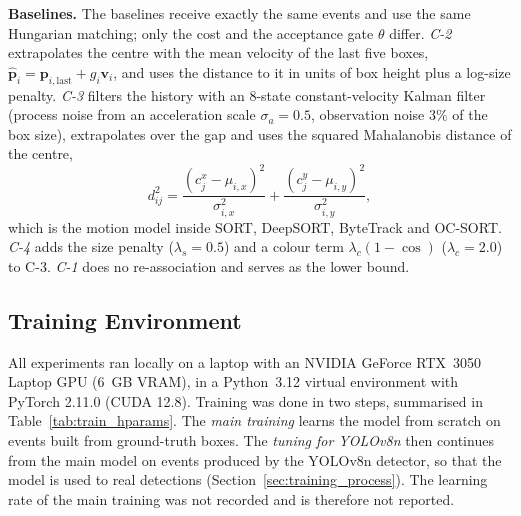 \textbf{Baselines.} The baselines receive exactly the same events and use the same Hungarian matching; only the cost and the acceptance gate $\theta$ differ. \emph{C-2} extrapolates the centre with the mean velocity of the last five boxes, $\hat{\mathbf{p}}_i = \mathbf{p}_{i,\text{last}} + g_i \mathbf{v}_i$, and uses the distance to it in units of box height plus a log-size penalty. \emph{C-3} filters the history with an 8-state constant-velocity Kalman filter (process noise from an acceleration scale $\sigma_a = 0.5$, observation noise $3\%$ of the box size), extrapolates over the gap and uses the squared Mahalanobis distance of the centre,
\begin{equation}
    d^2_{ij} = \frac{(c^x_j - \mu_{i,x})^2}{\sigma^2_{i,x}} + \frac{(c^y_j - \mu_{i,y})^2}{\sigma^2_{i,y}},
\end{equation}
which is the motion model inside SORT, DeepSORT, ByteTrack and OC-SORT. \emph{C-4} adds the size penalty ($\lambda_s = 0.5$) and a colour term $\lambda_c(1-\cos)$ ($\lambda_c = 2.0$) to C-3. \emph{C-1} does no re-association and serves as the lower bound.

\subsection{Training Environment}
\label{sec:training_env}

All experiments ran locally on a laptop with an NVIDIA GeForce RTX~3050 Laptop GPU (6~GB VRAM), in a Python~3.12 virtual environment with PyTorch 2.11.0 (CUDA 12.8). Training was done in two steps, summarised in Table~\ref{tab:train_hparams}. The \emph{main training} learns the model from scratch on events built from ground-truth boxes. The \emph{tuning for YOLOv8n} then continues from the main model on events produced by the YOLOv8n detector, so that the model is used to real detections (Section~\ref{sec:training_process}). The learning rate of the main training was not recorded and is therefore not reported.

